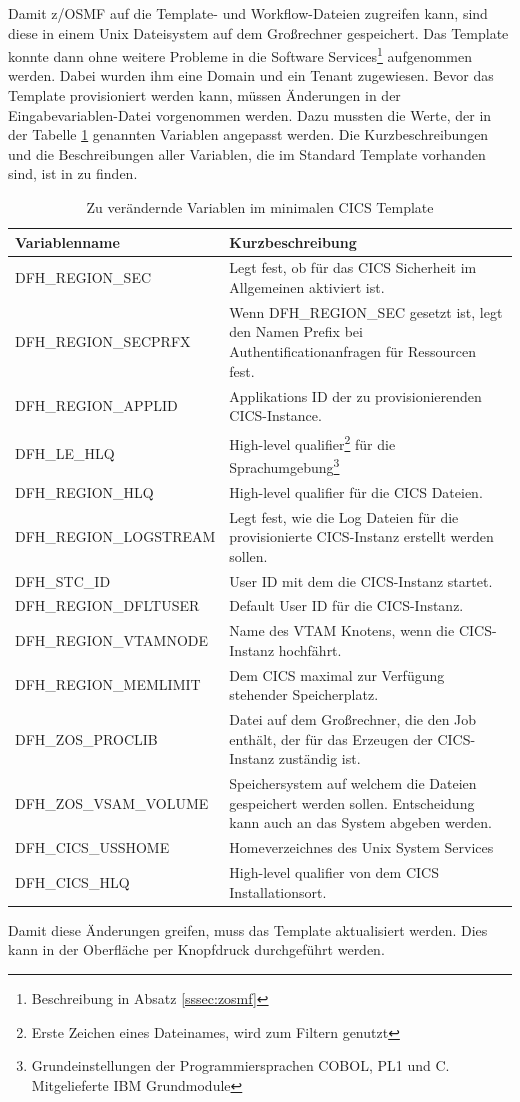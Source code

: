 Damit z/OSMF auf die Template- und Workflow-Dateien zugreifen kann, sind diese in einem Unix Dateisystem auf dem Großrechner gespeichert.
Das Template konnte dann ohne weitere Probleme in die Software Services\footnote{Beschreibung in Absatz \ref{sssec:zosmf}} aufgenommen werden.
Dabei wurden ihm eine Domain und ein Tenant zugewiesen.
Bevor das Template provisioniert werden kann, müssen Änderungen in der Eingabevariablen-Datei vorgenommen werden.
Dazu mussten die Werte, der in der Tabelle \ref{tab:cgsvars} genannten Variablen angepasst werden.
Die Kurzbeschreibungen und die Beschreibungen aller Variablen, die im Standard Template vorhanden sind, ist in \cite{IBM.2019} zu finden.
\begin{table}[h]
\centering
\begin{tabularx}{\textwidth}{X|X}
Variablenname & Kurzbeschreibung \\
\hline
DFH\_REGION\_SEC & Legt fest, ob für das CICS Sicherheit im Allgemeinen aktiviert ist. \\
\hline
DFH\_REGION\_SECPRFX & Wenn DFH\_REGION\_SEC gesetzt ist, legt den Namen Prefix bei Authentificationanfragen für Ressourcen fest. \\
\hline
DFH\_REGION\_APPLID & Applikations ID der zu provisionierenden CICS-Instance. \\
\hline
DFH\_LE\_HLQ & High-level qualifier\footnote{Erste Zeichen eines Dateinames, wird zum Filtern genutzt} für die Sprachumgebung\footnote{Grundeinstellungen der Programmiersprachen COBOL, PL1 und C. Mitgelieferte IBM Grundmodule} \\
\hline
DFH\_REGION\_HLQ & High-level qualifier für die CICS Dateien.\\
\hline
DFH\_REGION\_LOGSTREAM & Legt fest, wie die Log Dateien für die provisionierte CICS-Instanz erstellt werden sollen. \\
\hline
DFH\_STC\_ID & User ID mit dem die CICS-Instanz startet. \\
\hline
DFH\_REGION\_DFLTUSER & Default User ID für die CICS-Instanz. \\
\hline
DFH\_REGION\_VTAMNODE & Name des VTAM Knotens, wenn die CICS-Instanz hochfährt. \\
\hline
DFH\_REGION\_MEMLIMIT & Dem CICS maximal zur Verfügung stehender Speicherplatz. \\
\hline
DFH\_ZOS\_PROCLIB & Datei auf dem Großrechner, die den Job enthält, der für das Erzeugen der CICS-Instanz zuständig ist. \\
\hline
DFH\_ZOS\_VSAM\_VOLUME & Speichersystem auf welchem die Dateien gespeichert werden sollen. Entscheidung kann auch an das System abgeben werden. \\
\hline
DFH\_CICS\_USSHOME & Homeverzeichnes des Unix System Services \\
\hline
DFH\_CICS\_HLQ & High-level qualifier von dem CICS Installationsort. \\
\end{tabularx}
\caption{Zu verändernde Variablen im minimalen CICS Template}
\label{tab:cgsvars}
\end{table}
Damit diese Änderungen greifen, muss das Template aktualisiert werden.
Dies kann in der Oberfläche per Knopfdruck durchgeführt werden.


